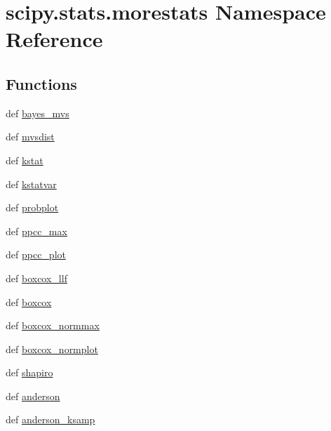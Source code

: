 \hypertarget{namespacescipy_1_1stats_1_1morestats}{}\section{scipy.\+stats.\+morestats Namespace Reference}
\label{namespacescipy_1_1stats_1_1morestats}
\subsection*{Functions}
\begin{DoxyCompactItemize}
\item 
def \hyperlink{namespacescipy_1_1stats_1_1morestats_afacc47108b5e9abae34bf101455f4596}{bayes\+\_\+mvs}
\item 
def \hyperlink{namespacescipy_1_1stats_1_1morestats_aa623bea35a2cc0df27bfc3f0d8206fb2}{mvsdist}
\item 
def \hyperlink{namespacescipy_1_1stats_1_1morestats_a1f9ae31f25852b8042a8bee76c2d4f2b}{kstat}
\item 
def \hyperlink{namespacescipy_1_1stats_1_1morestats_ad6abd69ba95df6a180701ff3bfd0566b}{kstatvar}
\item 
def \hyperlink{namespacescipy_1_1stats_1_1morestats_a0ce2313ec9f9874d21bba36d74c2b075}{probplot}
\item 
def \hyperlink{namespacescipy_1_1stats_1_1morestats_a3b440b836fcfd72740213ead34c4e947}{ppcc\+\_\+max}
\item 
def \hyperlink{namespacescipy_1_1stats_1_1morestats_ab51988447490daeea0b39ac8d5172e07}{ppcc\+\_\+plot}
\item 
def \hyperlink{namespacescipy_1_1stats_1_1morestats_a72c28ea7d3a2cb0d22da1cdb4923e82e}{boxcox\+\_\+llf}
\item 
def \hyperlink{namespacescipy_1_1stats_1_1morestats_a9c746d8a1f0e8b4de8f4ff80cd86aedc}{boxcox}
\item 
def \hyperlink{namespacescipy_1_1stats_1_1morestats_ac184ad145ff7a12af69b64044f075588}{boxcox\+\_\+normmax}
\item 
def \hyperlink{namespacescipy_1_1stats_1_1morestats_a208d9606d7c01574d651aefc3ab63e27}{boxcox\+\_\+normplot}
\item 
def \hyperlink{namespacescipy_1_1stats_1_1morestats_a7345bab19f49a0830910da93455ba6de}{shapiro}
\item 
def \hyperlink{namespacescipy_1_1stats_1_1morestats_a887883017dc52fa5feba58c70b1153fc}{anderson}
\item 
def \hyperlink{namespacescipy_1_1stats_1_1morestats_a577c1938c837ded86d281da702c48371}{anderson\+\_\+ksamp}

\end{DoxyCompactItemize}
